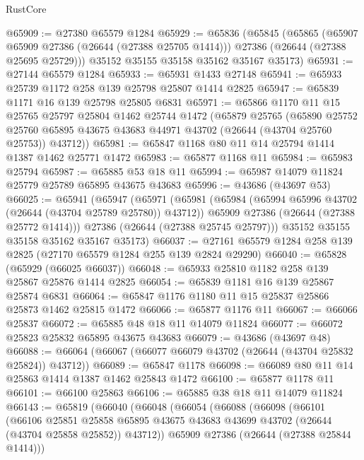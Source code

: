 \begin{lexlean}{RustCore}
\begin{coremodule}
@65909 := @27380 @65579 @1284
@65929 := @65836
    (@65845
      (@65865
        (@65907 @65909 @27386 (@26644 (@27388 @25705 @1414)))
        @27386
        (@26644 (@27388 @25695 @25729)))
      @35152
      @35155
      @35158
      @35162
      @35167
      @35173)
@65931 := @27144 @65579 @1284
@65933 := @65931 @1433 @27148
@65941 := @65933 @25739 @1172 @258 @139 @25798 @25807 @1414 @2825
@65947 := @65839 @1171 @16 @139 @25798 @25805 @6831
@65971 := @65866
    @1170
    @11
    @15
    @25765
    @25797
    @25804
    @1462
    @25744
    @1472
    (@65879
      @25765
      (@65890
        @25752
        @25760
        @65895
        @43675
        @43683
        @44971
        @43702
        (@26644 (@43704 @25760 @25753))
        @43712))
@65981 := @65847 @1168 @80 @11 @14 @25794 @1414 @1387 @1462 @25771 @1472
@65983 := @65877 @1168 @11
@65984 := @65983 @25794
@65987 := @65885 @53 @18 @11
@65994 := @65987 @14079 @11824 @25779 @25789 @65895 @43675 @43683
@65996 := @43686 (@43697 @53)
@66025 := @65941
    (@65947
      (@65971
        (@65981
          (@65984 (@65994 @65996 @43702 (@26644 (@43704 @25789 @25780)) @43712))
          @65909
          @27386
          (@26644 (@27388 @25772 @1414)))
        @27386
        (@26644 (@27388 @25745 @25797)))
      @35152
      @35155
      @35158
      @35162
      @35167
      @35173)
@66037 := @27161 @65579 @1284 @258 @139 @2825 (@27170 @65579 @1284 @255 @139 @2824 @29290)
@66040 := @65828 (@65929 (@66025 @66037))
@66048 := @65933 @25810 @1182 @258 @139 @25867 @25876 @1414 @2825
@66054 := @65839 @1181 @16 @139 @25867 @25874 @6831
@66064 := @65847 @1176 @1180 @11 @15 @25837 @25866 @25873 @1462 @25815 @1472
@66066 := @65877 @1176 @11
@66067 := @66066 @25837
@66072 := @65885 @48 @18 @11 @14079 @11824
@66077 := @66072 @25823 @25832 @65895 @43675 @43683
@66079 := @43686 (@43697 @48)
@66088 := @66064 (@66067 (@66077 @66079 @43702 (@26644 (@43704 @25832 @25824)) @43712))
@66089 := @65847 @1178
@66098 := @66089 @80 @11 @14 @25863 @1414 @1387 @1462 @25843 @1472
@66100 := @65877 @1178 @11
@66101 := @66100 @25863
@66106 := @65885 @38 @18 @11 @14079 @11824
@66143 := @65819
    (@66040
      (@66048
        (@66054
          (@66088
            (@66098
              (@66101
                (@66106
                  @25851
                  @25858
                  @65895
                  @43675
                  @43683
                  @43699
                  @43702
                  (@26644 (@43704 @25858 @25852))
                  @43712))
              @65909
              @27386
              (@26644 (@27388 @25844 @1414)))

\end{coremodule}
\end{lexlean}
